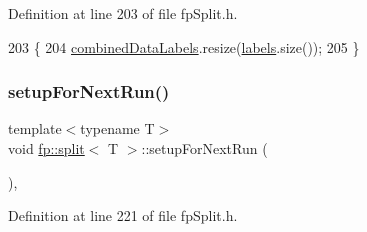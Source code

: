 Definition at line 203 of file fp\+Split.\+h.


\begin{DoxyCode}
203                                                 \{
204                     \hyperlink{classfp_1_1split_ac8f54cf4a42335814e10e351c49e3c32}{combinedDataLabels}.resize(\hyperlink{classfp_1_1split_a9658b163c2cd30e9900e21c3b1c3f2f9}{labels}.size());
205                 \}
\end{DoxyCode}
\mbox{\label{classfp_1_1split_a5ccfceb36e8ea567816af95bb4ae4fea}} 
\subsubsection{\texorpdfstring{setup\+For\+Next\+Run()}{setupForNextRun()}}
{\footnotesize\ttfamily template$<$typename T$>$ \\
void \hyperlink{classfp_1_1split}{fp\+::split}$<$ T $>$\+::setup\+For\+Next\+Run (\begin{DoxyParamCaption}{ }\end{DoxyParamCaption})\hspace{0.3cm}{\ttfamily [inline]}, {\ttfamily [protected]}}



Definition at line 221 of file fp\+Split.\+h.



